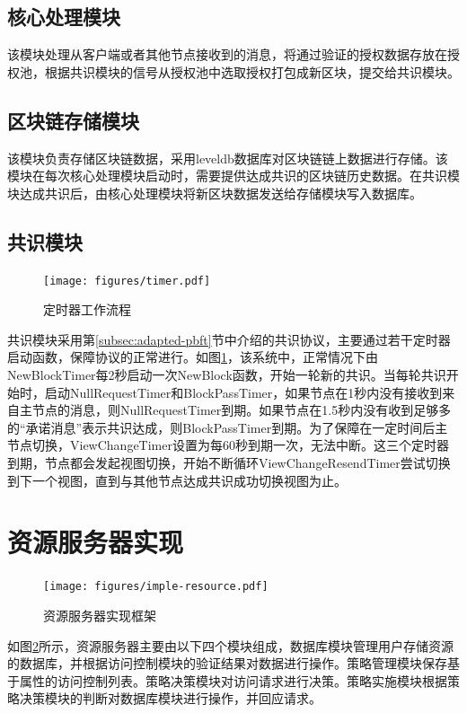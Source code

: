 \subsection{核心处理模块}

该模块处理从客户端或者其他节点接收到的消息，将通过验证的授权数据存放在授权池，根据共识模块的信号从授权池中选取授权打包成新区块，提交给共识模块。

\subsection{区块链存储模块}

该模块负责存储区块链数据，采用leveldb数据库对区块链链上数据进行存储。该模块在每次核心处理模块启动时，需要提供达成共识的区块链历史数据。在共识模块达成共识后，由核心处理模块将新区块数据发送给存储模块写入数据库。

\subsection{共识模块}

\begin{figure}
\centering
\texttt{[image: figures/timer.pdf]}
\caption{定时器工作流程}
\label{fig:timer}
\end{figure}

共识模块采用第\ref{subsec:adapted-pbft}节中介绍的共识协议，主要通过若干定时器启动函数，保障协议的正常进行。如图\ref{fig:timer}，该系统中，正常情况下由NewBlockTimer每2秒启动一次NewBlock函数，开始一轮新的共识。当每轮共识开始时，启动NullRequestTimer和BlockPassTimer，如果节点在1秒内没有接收到来自主节点的消息，则NullRequestTimer到期。如果节点在1.5秒内没有收到足够多的“承诺消息”表示共识达成，则BlockPassTimer到期。为了保障在一定时间后主节点切换，ViewChangeTimer设置为每60秒到期一次，无法中断。这三个定时器到期，节点都会发起视图切换，开始不断循环ViewChangeResendTimer尝试切换到下一个视图，直到与其他节点达成共识成功切换视图为止。

\section{资源服务器实现}

\begin{figure}[ht]
\centering
\texttt{[image: figures/imple-resource.pdf]}
\caption{资源服务器实现框架}
\label{fig:imple-resource}
\end{figure}

如图\ref{fig:imple-resource}所示，资源服务器主要由以下四个模块组成，数据库模块管理用户存储资源的数据库，并根据访问控制模块的验证结果对数据进行操作。策略管理模块保存基于属性的访问控制列表。策略决策模块对访问请求进行决策。策略实施模块根据策略决策模块的判断对数据库模块进行操作，并回应请求。

